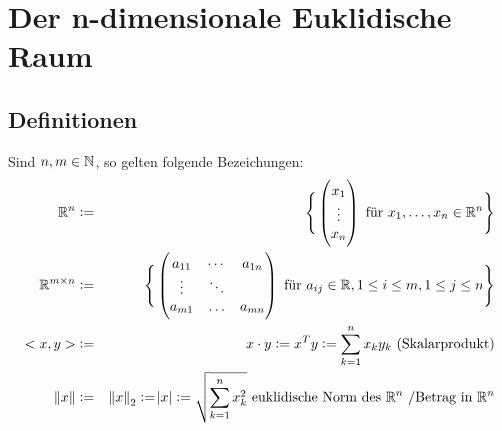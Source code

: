 \section{Der n-dimensionale Euklidische Raum}

\subsection{Definitionen}
Sind $n, m \in \mathbb{N}$, so gelten folgende Bezeichungen:
\begin{eqnarray*}
    \mathbb{R}^n &:=& \Bigg\{
        \begin{pmatrix}
            x_1\\
            \vdots \\
            x_n
        \end{pmatrix}
        \text{ für }
        x_1, \ldots, x_n \in \mathbb{R}^n
    \Bigg\} \\
    \mathbb{R}^{m \times n} &:=& \Bigg\{
        \begin{pmatrix}
            a_{11} & \cdots & a_{1n}\\
            \vdots & \ddots\\
            a_{m1} & \ldots & a_{mn}
        \end{pmatrix}
        \text{ für }
        a_{ij} \in \mathbb{R}, 1 \leq i \leq m, 1 \leq j \leq n
    \Bigg\}\\
    <x, y> &:=& x \cdot y := x^T y := \sum_{k=1}^n x_k y_k \text{ (Skalarprodukt)}\\
    \norm{x} &:=& {\Vert x \Vert}_2 := \abs{x} := \sqrt{\sum_{k=1}^n x_k^2}
    \text{ euklidische Norm des }\mathbb{R}^n\text{ /Betrag in }\mathbb{R}^n
\end{eqnarray*}


